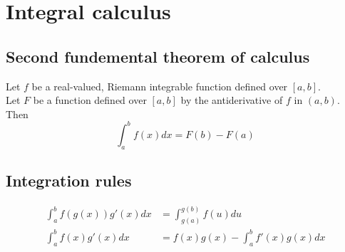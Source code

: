 \documentclass{article}
\begin{document}
\section{Integral calculus}

\subsection{Second fundemental theorem of calculus}
Let $f$ be a real-valued, Riemann integrable function defined over $[a,b]$.\\
Let $F$ be a function defined over $[a,b]$ by the antiderivative of $f$ in $(a,b)$. Then
\begin{equation}
\int_a^bf(x)dx=F(b)-F(a)
\end{equation}

\subsection{Integration rules}
\begin{align}
\int_a^bf(g(x))g'(x)dx&=\int_{g(a)}^{g(b)}f(u)du\\
\int_a^bf(x)g'(x)dx&=f(x)g(x)-\int_a^bf'(x)g(x)dx
\end{align}
\end{document}
